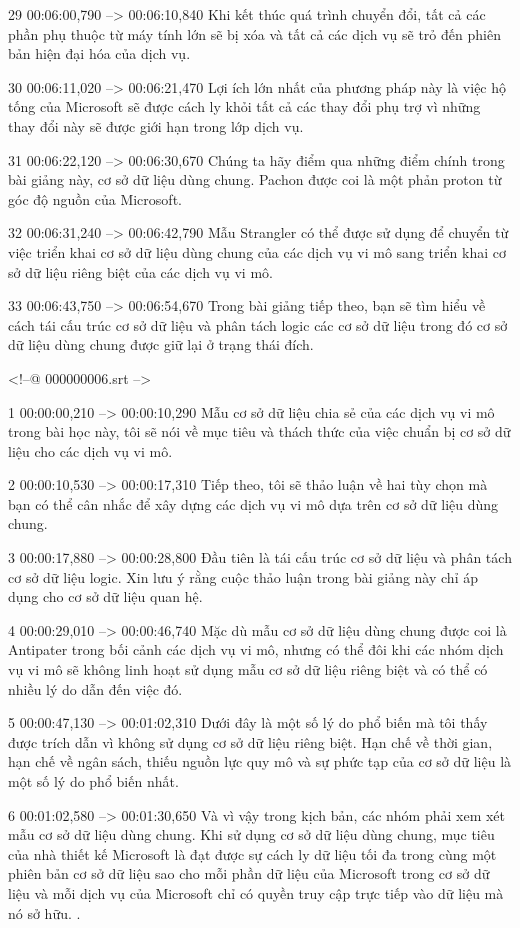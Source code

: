 29
00:06:00,790 --> 00:06:10,840
Khi kết thúc quá trình chuyển đổi, tất cả các phần phụ thuộc từ máy tính lớn sẽ bị xóa và tất cả các dịch vụ sẽ trỏ đến phiên bản hiện đại hóa của dịch vụ.

30
00:06:11,020 --> 00:06:21,470
Lợi ích lớn nhất của phương pháp này là việc hộ tống của Microsoft sẽ được cách ly khỏi tất cả các thay đổi phụ trợ vì những thay đổi này sẽ được giới hạn trong lớp dịch vụ.

31
00:06:22,120 --> 00:06:30,670
Chúng ta hãy điểm qua những điểm chính trong bài giảng này, cơ sở dữ liệu dùng chung.  Pachon được coi là một phản proton từ góc độ nguồn của Microsoft.

32
00:06:31,240 --> 00:06:42,790
Mẫu Strangler có thể được sử dụng để chuyển từ việc triển khai cơ sở dữ liệu dùng chung của các dịch vụ vi mô sang triển khai cơ sở dữ liệu riêng biệt của các dịch vụ vi mô.

33
00:06:43,750 --> 00:06:54,670
Trong bài giảng tiếp theo, bạn sẽ tìm hiểu về cách tái cấu trúc cơ sở dữ liệu và phân tách logic các cơ sở dữ liệu trong đó cơ sở dữ liệu dùng chung được giữ lại ở trạng thái đích.

<!--@ 000000006.srt -->

1
00:00:00,210 --> 00:00:10,290
Mẫu cơ sở dữ liệu chia sẻ của các dịch vụ vi mô trong bài học này, tôi sẽ nói về mục tiêu và thách thức của việc chuẩn bị cơ sở dữ liệu cho các dịch vụ vi mô.

2
00:00:10,530 --> 00:00:17,310
Tiếp theo, tôi sẽ thảo luận về hai tùy chọn mà bạn có thể cân nhắc để xây dựng các dịch vụ vi mô dựa trên cơ sở dữ liệu dùng chung.

3
00:00:17,880 --> 00:00:28,800
Đầu tiên là tái cấu trúc cơ sở dữ liệu và phân tách cơ sở dữ liệu logic.  Xin lưu ý rằng cuộc thảo luận trong bài giảng này chỉ áp dụng cho cơ sở dữ liệu quan hệ.

4
00:00:29,010 --> 00:00:46,740
Mặc dù mẫu cơ sở dữ liệu dùng chung được coi là Antipater trong bối cảnh các dịch vụ vi mô, nhưng có thể đôi khi các nhóm dịch vụ vi mô sẽ không linh hoạt sử dụng mẫu cơ sở dữ liệu riêng biệt và có thể có nhiều lý do dẫn đến việc đó.

5
00:00:47,130 --> 00:01:02,310
Dưới đây là một số lý do phổ biến mà tôi thấy được trích dẫn vì không sử dụng cơ sở dữ liệu riêng biệt.  Hạn chế về thời gian, hạn chế về ngân sách, thiếu nguồn lực quy mô và sự phức tạp của cơ sở dữ liệu là một số lý do phổ biến nhất.

6
00:01:02,580 --> 00:01:30,650
Và vì vậy trong kịch bản, các nhóm phải xem xét mẫu cơ sở dữ liệu dùng chung.  Khi sử dụng cơ sở dữ liệu dùng chung, mục tiêu của nhà thiết kế Microsoft là đạt được sự cách ly dữ liệu tối đa trong cùng một phiên bản cơ sở dữ liệu sao cho mỗi phần dữ liệu của Microsoft trong cơ sở dữ liệu và mỗi dịch vụ của Microsoft chỉ có quyền truy cập trực tiếp vào dữ liệu mà nó sở hữu.  .

